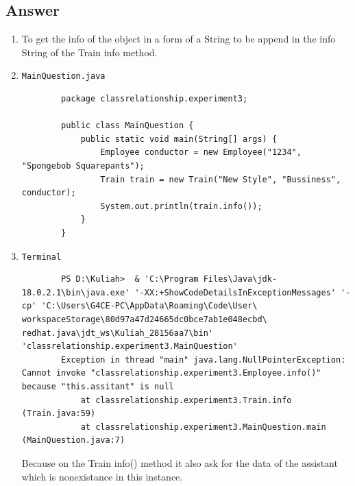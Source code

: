 \documentclass[12pt,titlepage]{article}
\begin{document}
\subsection{Answer}
\begin{enumerate}
    \item To get the info of the object in a form of a String to be append in the info String of the Train info method.
    \item \texttt{MainQuestion.java}
    \begin{verbatim}
        package classrelationship.experiment3;

        public class MainQuestion {
            public static void main(String[] args) {
                Employee conductor = new Employee("1234", "Spongebob Squarepants");
                Train train = new Train("New Style", "Bussiness", conductor);
                System.out.println(train.info());
            }
        }
    \end{verbatim}
    \item \texttt{Terminal}
    \begin{verbatim}
        PS D:\Kuliah>  & 'C:\Program Files\Java\jdk-18.0.2.1\bin\java.exe' '-XX:+ShowCodeDetailsInExceptionMessages' '-cp' 'C:\Users\G4CE-PC\AppData\Roaming\Code\User\ workspaceStorage\80d97a47d24665dc0bce7ab1e048ecbd\ redhat.java\jdt_ws\Kuliah_28156aa7\bin' 'classrelationship.experiment3.MainQuestion'
        Exception in thread "main" java.lang.NullPointerException: Cannot invoke "classrelationship.experiment3.Employee.info()" because "this.assitant" is null
            at classrelationship.experiment3.Train.info (Train.java:59)
            at classrelationship.experiment3.MainQuestion.main (MainQuestion.java:7) 
    \end{verbatim}
    Because on the Train info() method it also ask for the data of the assistant which is nonexistance in this instance.
\end{enumerate}
\end{document}
